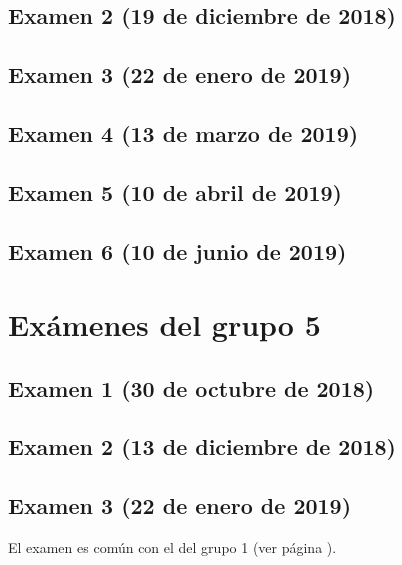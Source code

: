 \documentclass[a4paper,12pt,twoside]{book}
\begin{document}
\section{Examen 2 (19 de diciembre de 2018)}
\section{Examen 3 (22 de enero de 2019)}
 \label{examen_18_19_4_3}
\section{Examen 4 (13 de marzo de 2019)}
\section{Examen 5 (10 de abril de 2019)}
\section{Examen 6 (10 de junio de 2019)}
 \label{examen_18_19_4_6}
        
\chapter{Exámenes del grupo 5}
\section{Examen 1 (30 de octubre de 2018)}
\section{Examen 2 (13 de diciembre de 2018)}
\section{Examen 3 (22 de enero de 2019)}
El examen es común con el del grupo 1 (ver página \pageref{examen_18_19_1_3}).
\end{document}
